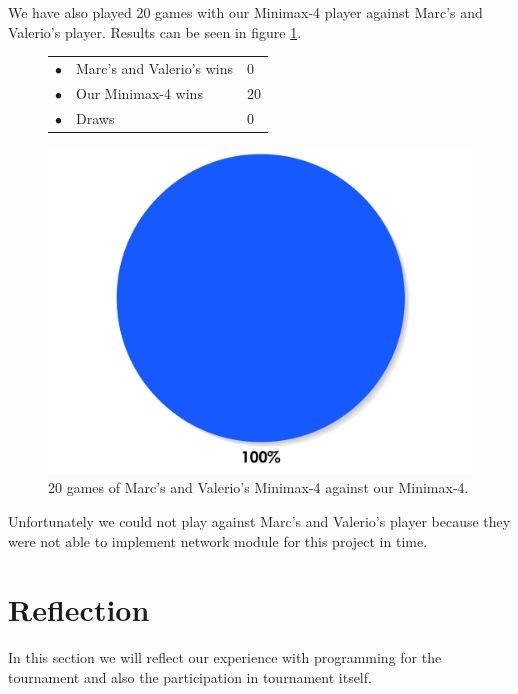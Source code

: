 \documentclass[paper=a4, fontsize=11pt]{article} %
\newcommand{\ra}[1]{\renewcommand{\arraystretch}{#1}}
\begin{document}
We have also played 20 games with our Minimax-4 player against Marc's and Valerio's player.
Results can be seen in figure \ref{fig:tournament2}.
\begin{figure}[ht]
    \begin{minipage}[c]{0.40\linewidth}
        \centering
        \ra{1.3}
        \begin{tabular}{cll}
            \toprule
            \textcolor{red!100}{$\bullet$} & Marc's and Valerio's wins & 0       \\
            \textcolor{blue!100!yellow!100!red!80}{$\bullet$} & Our Minimax-4  wins & 20      \\  
            \textcolor{gray!100}{$\bullet$} & Draws & 0      \\  
            \bottomrule
        \end{tabular}
    \end{minipage}
    \begin{minipage}[c]{0.60\linewidth}
        \centering
        \includegraphics[scale=0.35]{img/tournament2.pdf}
    \end{minipage}
    \caption{20 games of Marc's and Valerio's Minimax-4 against our Minimax-4.}
	\label{fig:tournament2}
\end{figure}


Unfortunately we could not play against Marc's and Valerio's player because they were not able to implement network module for this project in time.


\section{Reflection}
In this section we will reflect our experience with programming for the tournament and also the participation in tournament itself.
\end{document}
